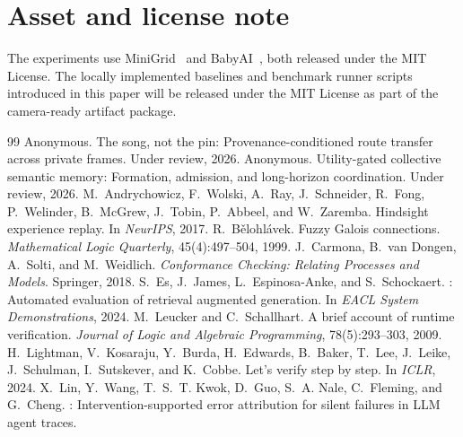 \documentclass{article}
\begin{document}
\section{Asset and license note}
\label{p1:app:assets}

The experiments use MiniGrid~\citep{MinigridMiniworld23} and BabyAI~\citep{chevalier2018babyai}, both released under the MIT License. The locally implemented baselines and benchmark runner scripts introduced in this paper will be released under the MIT License as part of the camera-ready artifact package.

\clearpage
\FloatBarrier
\FloatBarrier


\begin{thebibliography}{99}
Anonymous.
\newblock The song, not the pin: Provenance-conditioned route transfer across private frames.
\newblock Under review, 2026.
Anonymous.
\newblock Utility-gated collective semantic memory: Formation, admission, and long-horizon coordination.
\newblock Under review, 2026.
M.~Andrychowicz, F.~Wolski, A.~Ray, J.~Schneider, R.~Fong, P.~Welinder, B.~McGrew, J.~Tobin, P.~Abbeel, and W.~Zaremba.
\newblock Hindsight experience replay.
\newblock In \emph{NeurIPS}, 2017.
R.~B\v{e}lohl\'avek.
\newblock Fuzzy Galois connections.
\newblock \emph{Mathematical Logic Quarterly}, 45(4):497--504, 1999.
J.~Carmona, B.~van Dongen, A.~Solti, and M.~Weidlich.
\newblock \emph{Conformance Checking: Relating Processes and Models}.
\newblock Springer, 2018.
S.~Es, J.~James, L.~Espinosa-Anke, and S.~Schockaert.
: Automated evaluation of retrieval augmented generation.
\newblock In \emph{EACL System Demonstrations}, 2024.
M.~Leucker and C.~Schallhart.
\newblock A brief account of runtime verification.
\newblock \emph{Journal of Logic and Algebraic Programming}, 78(5):293--303, 2009.
H.~Lightman, V.~Kosaraju, Y.~Burda, H.~Edwards, B.~Baker, T.~Lee, J.~Leike, J.~Schulman, I.~Sutskever, and K.~Cobbe.
\newblock Let's verify step by step.
\newblock In \emph{ICLR}, 2024.
X.~Lin, Y.~Wang, T.~S.~T. Kwok, D.~Guo, S.~A. Nale, C.~Fleming, and G.~Cheng.
: Intervention-supported error attribution for silent failures in {LLM} agent traces.

\end{thebibliography}
\end{document}
